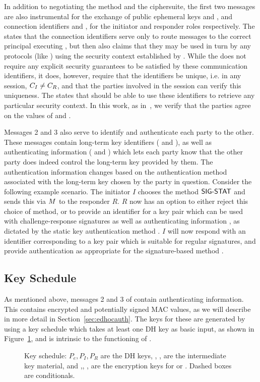 In addition to negotiating the method and the ciphersuite, the first two messages are also instrumental for the exchange of public ephemeral keys \mGx{} and \mGy{}, and connection identifiers \mCi{} and \mCr{}, for the initiator and responder roles respectively. 
%
The \mSpec{} states that the connection identifiers serve only to route messages to the correct principal executing \mEdhoc{}, but then also claims that they may be used in turn by any protocols (like \mOscore{}) using the security context established by \mEdhoc{}. 
%
While the \mSpec{} does not require any explicit security guarantees to be satisfied by these communication identifiers, it does, however, require that the identifiers be unique, i.e. in any session, $C_I{} \neq C_R{}$, and that the parties involved in the session can verify this uniqueness.
%
The \mSpec{} states that \mOscore{} should be able to use these identifiers to retrieve any particular security context.
%
In this work, as in~\cite{Norr21}, we verify that the parties agree on the values of \mCi{} and \mCr{}.

Messages 2 and 3 also serve to identify and authenticate each party to the other.
%
These messages contain long-term key identifiers (\mIdcredi{} and \mIdcredr{}), as well as authenticating information (\mAuthi{} and \mAuthr{}) which lets each party know that the other party does indeed control the long-term key provided by them.
%
The authentication information changes based on the authentication method associated with the long-term key chosen by the party in question.
%
Consider the following example scenario.
%
The initiator $I$ chooses the method $\textsf{SIG-STAT}{}$ and sends this via $M{}$ to the responder $R$.
%
$R$ now has an option to either reject this choice of method, or to provide an identifier \mIdcredr{} for a key pair which can be used with challenge-response signatures as well as authenticating information \mAuthr{}, as dictated by the static key authentication method \mStat{}.
%
$I$ will now respond with an identifier \mIdcredi{} corresponding to a key pair which is suitable for regular signatures, and provide authentication \mAuthi{} as appropriate for the signature-based method \mSig{}.

\subsection{Key Schedule}
\label{sec:keysched}
As mentioned above, messages 2 and 3 of \mEdhoc{} contain authenticating information.
%
This contains encrypted and potentially signed MAC values, as we will describe in more detail in Section~\ref{sec:edhocauth}.
%
The keys for these are generated by using a key schedule which takes at least one DH key \mGxy{} as basic input, as shown in Figure~\ref{fig:kdfdiagram}, and is intrinsic to the functioning of \mEdhoc{}.
%
\begin{figure}[!h]
\scalebox{.785}{

}
\caption{Key schedule: $P_e, P_I, P_R$ are the DH keys, \mPRKtwo, \mPRKthree, \mPRKfour are the intermediate key material, and \mKtwoe,\mKtwom, \mKthreeae, \mKthreem are the encryption keys for \mAead{} or \mXor{}. Dashed boxes are conditionals.~\cite{Norr21}}
\label{fig:kdfdiagram}
\end{figure}
%

